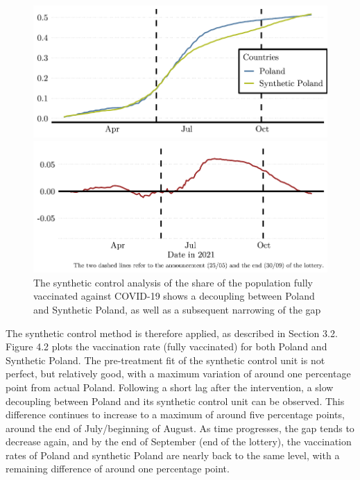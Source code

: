 \documentclass{scrbook}
\begin{document}
\begin{figure}[h]
\caption[Synthetic control analysis of the Polish lottery (share of the fully vaccinated)]{The synthetic control analysis of the share of the population fully vaccinated against COVID-19 shows a decoupling between Poland and Synthetic Poland, as well as a subsequent narrowing of the gap}

\begin{center}\includegraphics{bachelor_thesis_files/figure-latex/unnamed-chunk-3-1} \end{center}



\begin{center}\includegraphics{bachelor_thesis_files/figure-latex/unnamed-chunk-3-2} \end{center}
\end{figure}

The synthetic control method is therefore applied, as described in
Section 3.2. Figure 4.2 plots the vaccination rate (fully vaccinated)
for both Poland and Synthetic Poland. The pre-treatment fit of the
synthetic control unit is not perfect, but relatively good, with a
maximum variation of around one percentage point from actual Poland.
Following a short lag after the intervention, a slow decoupling between
Poland and its synthetic control unit can be observed. This difference
continues to increase to a maximum of around five percentage points,
around the end of July/beginning of August. As time progresses, the gap
tends to decrease again, and by the end of September (end of the
lottery), the vaccination rates of Poland and synthetic Poland are
nearly back to the same level, with a remaining difference of around one
percentage point.
\end{document}
